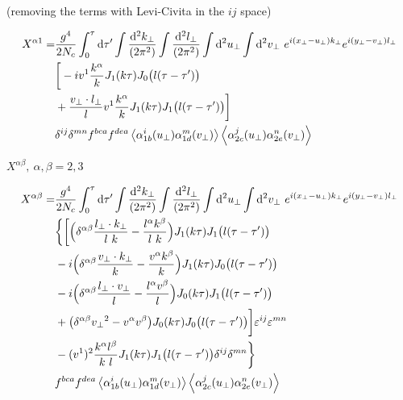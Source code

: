 (removing the terms with Levi-Civita in the $ij$ space)

\begin{equation*}
\begin{split}
 X^{\alpha 1} = &
\frac{g^4}{2 N_c}
\int_0^\tau \mathop{}\!\mathrm{d} \tau'
\int \frac{\mathop{}\!\mathrm{d}^2 k_\perp}{(2\pi^2)}
\int \frac{\mathop{}\!\mathrm{d}^2 l_\perp}{(2\pi^2)}
\int \mathop{}\!\mathrm{d}^2 u_\perp
\int \mathop{}\!\mathrm{d}^2 v_\perp ~
e^{i (x_\perp - u_\perp) k_\perp}
e^{i (y_\perp - v_\perp) l_\perp} \\
& \bigg[  - i v^1 \frac{k^\alpha}{k} J_1(k \tau) J_0\big(l(\tau-\tau')\big)   \\
& + \frac{v_\perp \cdot l_\perp}{l}  v^1 \frac{k^\alpha}{k} J_1(k\tau) J_1\big(l(\tau-\tau')\big)  \bigg]\\
& \delta^{ij} \delta^{mn}  f^{bca} f^{dea}
\left< \alpha^i_{1b} (u_\perp) \alpha^m_{1d} (v_\perp) \right>  \left< \alpha^j_{2c} (u_\perp) \alpha^n_{2e} (v_\perp) \right>
\end{split}
\end{equation*}


\newpage

$X^{\alpha \beta}, ~\alpha, \beta=2,3$

\begin{equation*}
\begin{split}
 X^{\alpha \beta} = &
\frac{g^4}{2 N_c}
\int_0^\tau \mathop{}\!\mathrm{d} \tau'
\int \frac{\mathop{}\!\mathrm{d}^2 k_\perp}{(2\pi^2)}
\int \frac{\mathop{}\!\mathrm{d}^2 l_\perp}{(2\pi^2)}
\int \mathop{}\!\mathrm{d}^2 u_\perp
\int \mathop{}\!\mathrm{d}^2 v_\perp ~
e^{i (x_\perp - u_\perp) k_\perp}
e^{i (y_\perp - v_\perp) l_\perp} \\
& \bigg\{ \bigg[ \Big(\delta^{\alpha \beta} \frac{l_\perp \cdot k_\perp}{l ~k} - \frac{l^\alpha k^\beta}{l ~k}\Big) J_1 (k \tau) J_1\big(l(\tau-\tau')\big) \\
& -i \Big(\delta^{\alpha \beta} \frac{v_\perp \cdot k_\perp}{k} - \frac{v^\alpha k^\beta}{k}\Big) J_1 (k \tau) J_0\big(l(\tau-\tau')\big) \\
& -i \Big(\delta^{\alpha \beta} \frac{l_\perp \cdot v_\perp}{l} - \frac{l^\alpha v^\beta}{l}\Big) J_0 (k \tau) J_1\big(l(\tau-\tau')\big) \\
& + \big(\delta^{\alpha \beta} {v_\perp}^2 - v^\alpha v^\beta\big) J_0 (k \tau) J_0\big(l(\tau-\tau')\big) \bigg] \varepsilon^{ij} \varepsilon^{mn} \\ 
& -(v^1)^2 \frac{k^\alpha l^\beta}{k ~l} J_1 (k \tau) J_1\big(l(\tau-\tau')\big) \delta^{ij} \delta^{mn} \bigg\} \\
&  f^{bca} f^{dea}
\left< \alpha^i_{1b} (u_\perp) \alpha^m_{1d} (v_\perp) \right>  \left< \alpha^j_{2c} (u_\perp) \alpha^n_{2e} (v_\perp) \right>
\end{split}
\end{equation*}


